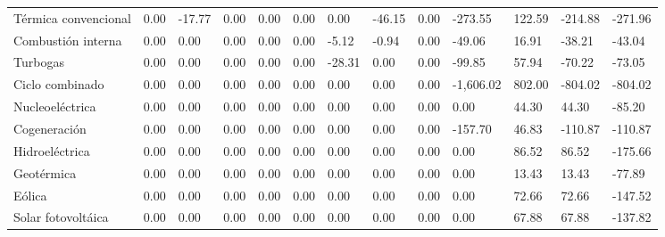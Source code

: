 \documentclass{sener2025}
\begin{document}
\begin{tabladoradoLargo}
\begin{xltabular}{\textwidth}{QZZZZZZZZZZZZ}
    \hspace{2.7em} Térmica convencional & 0.00 & -17.77 & 0.00 & 0.00 & 0.00 & 0.00 & -46.15 & 0.00 & -273.55 & 122.59 & -214.88 & -271.96 \\
    \hspace{2.7em} Combustión interna & 0.00 & 0.00 & 0.00 & 0.00 & 0.00 & -5.12 & -0.94 & 0.00 & -49.06 & 16.91 & -38.21 & -43.04 \\
    \hspace{2.7em} Turbogas & 0.00 & 0.00 & 0.00 & 0.00 & 0.00 & -28.31 & 0.00 & 0.00 & -99.85 & 57.94 & -70.22 & -73.05 \\
    \hspace{2.7em} Ciclo combinado & 0.00 & 0.00 & 0.00 & 0.00 & 0.00 & 0.00 & 0.00 & 0.00 & -1,606.02 & 802.00 & -804.02 & -804.02 \\
    \hspace{2.7em} Nucleoeléctrica & 0.00 & 0.00 & 0.00 & 0.00 & 0.00 & 0.00 & 0.00 & 0.00 & 0.00 & 44.30 & 44.30 & -85.20 \\
    \hspace{2.7em} Cogeneración & 0.00 & 0.00 & 0.00 & 0.00 & 0.00 & 0.00 & 0.00 & 0.00 & -157.70 & 46.83 & -110.87 & -110.87 \\
    \hspace{2.7em} Hidroeléctrica & 0.00 & 0.00 & 0.00 & 0.00 & 0.00 & 0.00 & 0.00 & 0.00 & 0.00 & 86.52 & 86.52 & -175.66 \\
    \hspace{2.7em} Geotérmica & 0.00 & 0.00 & 0.00 & 0.00 & 0.00 & 0.00 & 0.00 & 0.00 & 0.00 & 13.43 & 13.43 & -77.89 \\
    \hspace{2.7em} Eólica & 0.00 & 0.00 & 0.00 & 0.00 & 0.00 & 0.00 & 0.00 & 0.00 & 0.00 & 72.66 & 72.66 & -147.52 \\
    \hspace{2.7em} Solar fotovoltáica & 0.00 & 0.00 & 0.00 & 0.00 & 0.00 & 0.00 & 0.00 & 0.00 & 0.00 & 67.88 & 67.88 & -137.82 \\
  \end{xltabular}
\end{tabladoradoLargo}
\vspace{-4pt}
\end{document}
